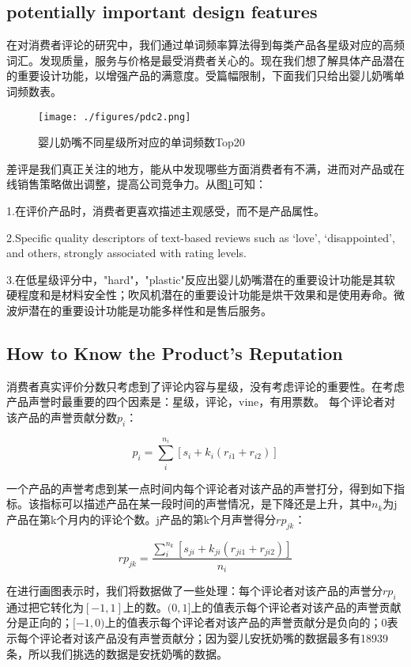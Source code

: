 \documentclass[UTF8]{article}
\newcommand{\upcite}[1]{\textsuperscript{\textsuperscript{\cite{#1}}}}
\begin{document}
\subsection{potentially important design features}
在对消费者评论的研究中，我们通过单词频率算法得到每类产品各星级对应的高频词汇。发现质量，服务与价格是最受消费者关心的。现在我们想了解具体产品潜在的重要设计功能，以增强产品的满意度。受篇幅限制，下面我们只给出婴儿奶嘴单词频数表。
\begin{figure}[H]
	\centering
	\texttt{[image: ./figures/pdc2.png]}
	\caption{婴儿奶嘴不同星级所对应的单词频数Top20} \label{pdc1}
\end{figure}

差评是我们真正关注的地方，能从中发现哪些方面消费者有不满，进而对产品或在线销售策略做出调整，提高公司竞争力。从图\ref{pdc1}可知：

1.在评价产品时，消费者更喜欢描述主观感受，而不是产品属性。

2.Specific quality descriptors of text-based reviews such as ‘love’, ‘disappointed’, and others, strongly associated with rating levels.

3.在低星级评分中，"hard"，"plastic"反应出婴儿奶嘴潜在的重要设计功能是其软硬程度和是材料安全性；吹风机潜在的重要设计功能是烘干效果和是使用寿命。微波炉潜在的重要设计功能是功能多样性和是售后服务。



\subsection{How to Know the Product’s Reputation}
消费者真实评价分数只考虑到了评论内容与星级，没有考虑评论的重要性。在考虑产品声誉时最重要的四个因素是：星级，评论，vine，有用票数。\upcite{WannThe}
每个评论者对该产品的声誉贡献分数$p_{i}$：

\begin{equation}\label{q2}
p_{i}=\sum_{i}^{n_i}[s_{i}+k_{i}(r_{i1}+r_{i2})]
\end{equation}

一个产品的声誉考虑到某一点时间内每个评论者对该产品的声誉打分，得到如下指标。该指标可以描述产品在某一段时间的声誉情况，是下降还是上升，其中$n_k$为j产品在第k个月内的评论个数。j产品的第k个月声誉得分$rp_{jk}$：

\begin{equation}\label{gs1}
rp_{jk}=\frac{\sum_{i}^{n_k}[s_{ji}+k_{ji}(r_{ji1}+r_{ji2})]}{n_i}
\end{equation}

在进行画图表示时，我们将数据做了一些处理：每个评论者对该产品的声誉分$rp_{i}$通过把它转化为$[-1,1]$上的数。$(0,1]$上的值表示每个评论者对该产品的声誉贡献分是正向的；$[-1,0)$上的值表示每个评论者对该产品的声誉贡献分是负向的；0表示每个评论者对该产品没有声誉贡献分；因为婴儿安抚奶嘴的数据最多有18939条，所以我们挑选的数据是安抚奶嘴的数据。
\end{document}
